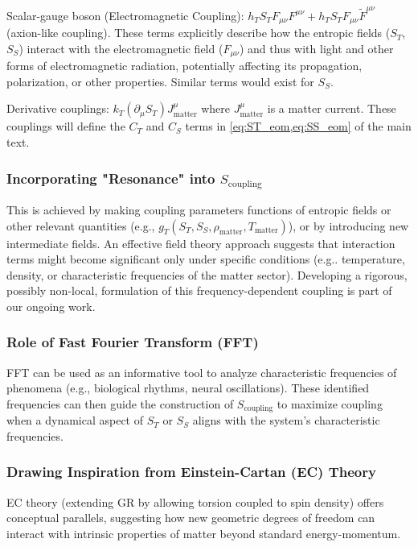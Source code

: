 \documentclass[11pt,a4paper]{article}
\newcommand{\ST}{S_T}
\newcommand{\SSp}{S_S}
\newcommand{\Scoupling}{S_{\text{coupling}}}
\begin{document}
Scalar-gauge boson (Electromagnetic Coupling): $h_T\ST F_{\mu\nu}F^{\mu\nu}+ h_T\ST F_{\mu\nu}\tilde{F}^{\mu\nu}$ (axion-like coupling). These terms explicitly describe how the entropic fields ($\ST$,$\SSp$) interact with the electromagnetic field ($F_{\mu\nu}$) and thus with light and other forms of electromagnetic radiation, potentially affecting its propagation, polarization, or other properties. Similar terms would exist for $\SSp$.

Derivative couplings: $k_T(\partial_\mu\ST)J^\mu_{\text{matter}}$ where $J^\mu_{\text{matter}}$ is a matter current. These couplings will define the $C_T$ and $C_S$ terms in \cref{eq:ST_eom,eq:SS_eom} of the main text.

\subsubsection{Incorporating "Resonance" into $\Scoupling$}
\label{app:A.2.3}
This is achieved by making coupling parameters functions of entropic fields or other relevant quantities (e.g., $g_T(\ST,\SSp,\rho_{\text{matter}},T_{\text{matter}})$), or by introducing new intermediate fields. An effective field theory approach suggests that interaction terms might become significant only under specific conditions (e.g.. temperature, density, or characteristic frequencies of the matter sector). Developing a rigorous, possibly non-local, formulation of this frequency-dependent coupling is part of our ongoing work.

\subsubsection{Role of Fast Fourier Transform (FFT)}
FFT can be used as an informative tool to analyze characteristic frequencies of phenomena (e.g., biological rhythms, neural oscillations). These identified frequencies can then guide the construction of $\Scoupling$ to maximize coupling when a dynamical aspect of $\ST$ or $\SSp$ aligns with the system's characteristic frequencies.

\subsubsection{Drawing Inspiration from Einstein-Cartan (EC) Theory}
EC theory (extending GR by allowing torsion coupled to spin density)\cite{Kibble1961,Sciama1964} offers conceptual parallels, suggesting how new geometric degrees of freedom can interact with intrinsic properties of matter beyond standard energy-momentum.
\end{document}
